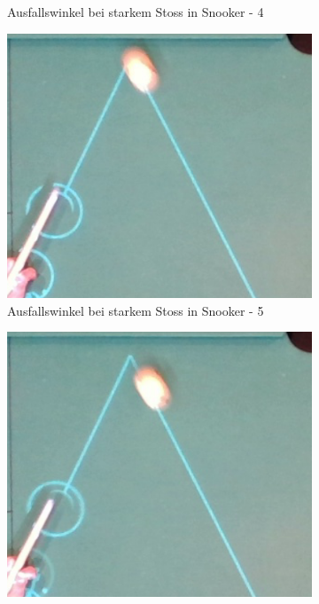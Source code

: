 \begin{figure}[h!]
\begin{subfigure}[t]{0.2\textwidth}
        \caption{Ausfallswinkel bei starkem Stoss in Snooker - 4}
        \label{fig:rebound_angle_fast_snooker_4}
    \end{subfigure}
    \hfill
    \begin{subfigure}[t]{0.2\textwidth}
        \centering
        \includegraphics[width=1.0\linewidth]{../common/04_results/resources/simulation/rebound_angle_fast_snooker/00_rail_rebound_angle_fast_snooker_05.png}
        \caption{Ausfallswinkel bei starkem Stoss in Snooker - 5}
        \label{fig:rebound_angle_fast_snooker_5}
    \end{subfigure}
    \hfill
    \begin{subfigure}[t]{0.2\textwidth}
        \centering
        \includegraphics[width=1.0\linewidth]{../common/04_results/resources/simulation/rebound_angle_fast_snooker/00_rail_rebound_angle_fast_snooker_06.png}

\end{subfigure}
\end{figure}
